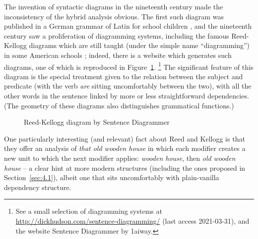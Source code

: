 \documentclass[output=paper,biblatex,babelshorthands,newtxmath,draftmode,colorlinks,citecolor=brown]{langscibook}
\begin{document}
The invention of syntactic diagrams in the nineteenth century made the inconsistency of the hybrid
analysis obvious. The first such diagram was published in a German grammar of Latin for school
children \citep{Billroth1832}, and the nineteenth century saw a proliferation of diagramming
systems, including the famous Reed-Kellogg diagrams which are still taught (under the simple name
``diagramming'') in some American schools \citep{ReedKellog1890}; indeed, there is a website which
generates such diagrams, one of which is reproduced in Figure~\ref{fig:2}.%
%
\footnote{See a small selection of diagramming systems at
  \url{http://dickhudson.com/sentence-diagramming/} (last access 2021-03-31), and the website
  Sentence Diagrammer by 1aiway.} 
%
The significant feature of this diagram is the special treatment given to the relation between the
subject and predicate (with the verb \emph{are} sitting uncomfortably between the two), with all the
other words in the sentence linked by more or less straightforward dependencies. (The geometry of
these diagrams also distinguishes grammatical functions.) 
 
 \begin{figure}
 	\centering
{}
	\caption{Reed-Kellogg diagram by Sentence Diagrammer}
	\label{fig:2}
 \end{figure}
 
One particularly interesting (and relevant) fact about Reed and Kellogg is that they offer an analysis of \emph{that old wooden house} in which each modifier creates a new unit to which the next modifier applies: \emph{wooden house}, then \emph{old wooden house} \citep[18]{Percival1976} – a clear hint at more modern structures (including the ones proposed in Section~\ref{sec:4.1}), albeit one that sits uncomfortably with plain-vanilla dependency structure.
\end{document}
